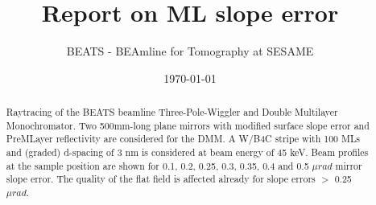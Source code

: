\documentclass{sesamebeatsnote}
\title{Report on ML slope error}
\author{BEATS - BEAmline for Tomography at SESAME}
\date{\today}
\begin{document}
\maketitle

\begin{abstract}
Raytracing of the BEATS beamline Three-Pole-Wiggler and Double Multilayer Monochromator. Two 500mm-long plane mirrors with modified surface slope error and PreMLayer reflectivity are considered for the DMM. A W/B4C stripe with 100 MLs and (graded) d-spacing of 3 nm is considered at beam energy of 45 keV. Beam profiles at the sample position are shown for 0.1, 0.2, 0.25, 0.3, 0.35, 0.4 and 0.5 $\mu rad$ mirror slope error. The quality of the flat field is affected already for slope errors $>$ 0.25 $\mu rad$.
\end{abstract}

\vfill
\makereviewtable

\clearpage

\begingroup
\color{black}
\tableofcontents
\endgroup
\pagebreak

% 





% 
% 
\end{document}
